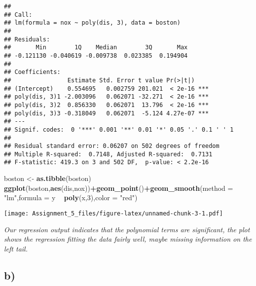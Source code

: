 \documentclass[]{article}
\newenvironment{Shaded}{\begin{snugshade}}{\end{snugshade}}
\newcommand{\KeywordTok}[1]{\textcolor[rgb]{0.13,0.29,0.53}{\textbf{#1}}}
\newcommand{\DataTypeTok}[1]{\textcolor[rgb]{0.13,0.29,0.53}{#1}}
\newcommand{\DecValTok}[1]{\textcolor[rgb]{0.00,0.00,0.81}{#1}}
\newcommand{\StringTok}[1]{\textcolor[rgb]{0.31,0.60,0.02}{#1}}
\newcommand{\OperatorTok}[1]{\textcolor[rgb]{0.81,0.36,0.00}{\textbf{#1}}}
\newcommand{\NormalTok}[1]{#1}
\begin{document}
\begin{verbatim}
## 
## Call:
## lm(formula = nox ~ poly(dis, 3), data = boston)
## 
## Residuals:
##       Min        1Q    Median        3Q       Max 
## -0.121130 -0.040619 -0.009738  0.023385  0.194904 
## 
## Coefficients:
##                Estimate Std. Error t value Pr(>|t|)    
## (Intercept)    0.554695   0.002759 201.021  < 2e-16 ***
## poly(dis, 3)1 -2.003096   0.062071 -32.271  < 2e-16 ***
## poly(dis, 3)2  0.856330   0.062071  13.796  < 2e-16 ***
## poly(dis, 3)3 -0.318049   0.062071  -5.124 4.27e-07 ***
## ---
## Signif. codes:  0 '***' 0.001 '**' 0.01 '*' 0.05 '.' 0.1 ' ' 1
## 
## Residual standard error: 0.06207 on 502 degrees of freedom
## Multiple R-squared:  0.7148, Adjusted R-squared:  0.7131 
## F-statistic: 419.3 on 3 and 502 DF,  p-value: < 2.2e-16
\end{verbatim}

\begin{Shaded}
\begin{Highlighting}[]
\NormalTok{boston <-}\StringTok{ }\KeywordTok{as.tibble}\NormalTok{(boston)}
\KeywordTok{ggplot}\NormalTok{(boston,}\KeywordTok{aes}\NormalTok{(dis,nox))}\OperatorTok{+}\KeywordTok{geom_point}\NormalTok{()}\OperatorTok{+}\KeywordTok{geom_smooth}\NormalTok{(}\DataTypeTok{method =} \StringTok{"lm"}\NormalTok{,}\DataTypeTok{formula =}\NormalTok{ y }\OperatorTok{~}\StringTok{ }\KeywordTok{poly}\NormalTok{(x,}\DecValTok{3}\NormalTok{),}\DataTypeTok{color =} \StringTok{"red"}\NormalTok{)}
\end{Highlighting}
\end{Shaded}

\texttt{[image: Assignment\_5\_files/figure-latex/unnamed-chunk-3-1.pdf]}

\emph{Our regression output indicates that the polynomial terms are
significant, the plot shows the regression fitting the data fairly well,
maybe missing information on the left tail.}

\subsection{b)}\label{b}
\end{document}
